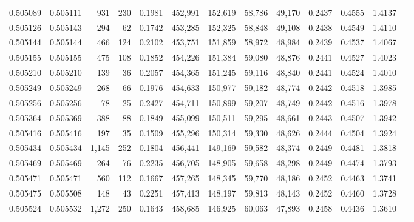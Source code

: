 \begin{tabular}{rrrrrrrrrrrrr}
0.505089 & 0.505111 &   931 &   230 &                                     0.1981 & 452,991 & 152,619 &  58,786 &  49,170 & 0.2437 & 0.4555 & 1.4137 \\
0.505126 & 0.505143 &   294 &    62 &                                     0.1742 & 453,285 & 152,325 &  58,848 &  49,108 & 0.2438 & 0.4549 & 1.4110 \\
0.505144 & 0.505144 &   466 &   124 &                                     0.2102 & 453,751 & 151,859 &  58,972 &  48,984 & 0.2439 & 0.4537 & 1.4067 \\
0.505155 & 0.505155 &   475 &   108 &                                     0.1852 & 454,226 & 151,384 &  59,080 &  48,876 & 0.2441 & 0.4527 & 1.4023 \\
0.505210 & 0.505210 &   139 &    36 &                                     0.2057 & 454,365 & 151,245 &  59,116 &  48,840 & 0.2441 & 0.4524 & 1.4010 \\
0.505249 & 0.505249 &   268 &    66 &                                     0.1976 & 454,633 & 150,977 &  59,182 &  48,774 & 0.2442 & 0.4518 & 1.3985 \\
0.505256 & 0.505256 &    78 &    25 &                                     0.2427 & 454,711 & 150,899 &  59,207 &  48,749 & 0.2442 & 0.4516 & 1.3978 \\
0.505364 & 0.505369 &   388 &    88 &                                     0.1849 & 455,099 & 150,511 &  59,295 &  48,661 & 0.2443 & 0.4507 & 1.3942 \\
0.505416 & 0.505416 &   197 &    35 &                                     0.1509 & 455,296 & 150,314 &  59,330 &  48,626 & 0.2444 & 0.4504 & 1.3924 \\
0.505434 & 0.505434 & 1,145 &   252 &                                     0.1804 & 456,441 & 149,169 &  59,582 &  48,374 & 0.2449 & 0.4481 & 1.3818 \\
0.505469 & 0.505469 &   264 &    76 &                                     0.2235 & 456,705 & 148,905 &  59,658 &  48,298 & 0.2449 & 0.4474 & 1.3793 \\
0.505471 & 0.505471 &   560 &   112 &                                     0.1667 & 457,265 & 148,345 &  59,770 &  48,186 & 0.2452 & 0.4463 & 1.3741 \\
0.505475 & 0.505508 &   148 &    43 &                                     0.2251 & 457,413 & 148,197 &  59,813 &  48,143 & 0.2452 & 0.4460 & 1.3728 \\
0.505524 & 0.505532 & 1,272 &   250 &                                     0.1643 & 458,685 & 146,925 &  60,063 &  47,893 & 0.2458 & 0.4436 & 1.3610 \\

\end{tabular}
